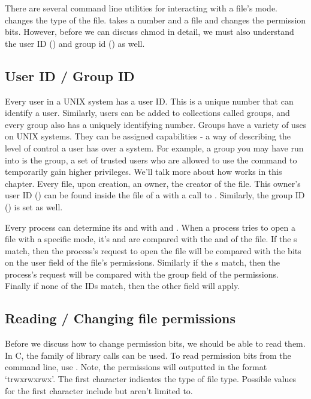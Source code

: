 There are several command line utilities for interacting with a file's mode.
 changes the type of the file.
 takes a number and a file and changes the permission bits.
However, before we can discuss chmod in detail, we must also understand the user ID () and group id () as well.

\subsection{User ID / Group ID}

Every user in a UNIX system has a user ID.
This is a unique number that can identify a user.
Similarly, users can be added to collections called groups, and every group also has a uniquely identifying number.
Groups have a variety of uses on UNIX systems.
They can be assigned capabilities - a way of describing the level of control a user has over a system.
For example, a group you may have run into is the  group, a set of trusted users who are allowed to use the command  to temporarily gain higher privileges.
We'll talk more about how  works in this chapter.
Every file, upon creation, an owner, the creator of the file.
This owner's user ID () can be found inside the  file of a  with a call to .
Similarly, the group ID () is set as well.

Every process can determine its  and  with  and .
When a process tries to open a file with a specific mode, it's  and  are compared with the  and  of the file.
If the s match, then the process's request to open the file will be compared with the bits on the user field of the file's permissions.
Similarly if the s match, then the process's request will be compared with the group field of the permissions.
Finally if none of the IDs match, then the other field will apply.

\subsection{Reading / Changing file permissions}

Before we discuss how to change permission bits, we should be able to read them.
In C, the  family of library calls can be used.
To read permission bits from the command line, use .
Note, the permissions will outputted in the format `trwxrwxrwx'.
The first character indicates the type of file type.
Possible values for the first character include but aren't limited to.

